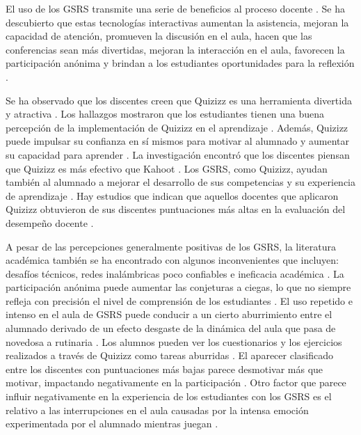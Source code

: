 \documentclass[spanish]{textolivre}
\begin{document}
El uso de los GSRS transmite una serie de beneficios al proceso docente \cite{wentao2017}. Se ha descubierto que estas tecnologías interactivas aumentan la asistencia, mejoran la capacidad de atención, promueven la discusión en el aula, hacen que las conferencias sean más divertidas, mejoran la interacción en el aula, favorecen la participación anónima y brindan a los estudiantes oportunidades para la reflexión \cite{goksun2019, wang2015}.

Se ha observado que los discentes creen que Quizizz es una herramienta divertida y atractiva \cite{zuhriyah2020}. Los hallazgos mostraron que los estudiantes tienen una buena percepción de la implementación de Quizizz en el aprendizaje \cite{dewi2021}. Además, Quizizz puede impulsar su confianza en sí mismos para motivar al alumnado y aumentar su capacidad para aprender \cite{irwansyah2021, zuhriyah2020}. La investigación encontró que los discentes piensan que Quizizz es más efectivo que Kahoot \cite{goksun2019}. Los GSRS, como Quizizz, ayudan también al alumnado a mejorar el desarrollo de sus competencias \cite{sahak2021, wolff2016} y su experiencia de aprendizaje \cite{chaiyo2017}. Hay estudios que indican que aquellos docentes que aplicaron Quizizz obtuvieron de sus discentes puntuaciones más altas en la evaluación del desempeño docente \cite{zhao2019}.

A pesar de las percepciones generalmente positivas de los GSRS, la literatura académica también se ha encontrado con algunos inconvenientes que incluyen: desafíos técnicos, redes inalámbricas poco confiables e ineficacia académica \cite{aljaloud2015}. La participación anónima puede aumentar las conjeturas a ciegas, lo que no siempre refleja con precisión el nivel de comprensión de los estudiantes \cite{nielsen2013}. El uso repetido e intenso en el aula de GSRS puede conducir a un cierto aburrimiento entre el alumnado derivado de un efecto desgaste de la dinámica del aula que pasa de novedosa a rutinaria \cite{wang2015}. Los alumnos pueden ver los cuestionarios y los ejercicios realizados a través de Quizizz como tareas aburridas \cite{mohamad2020}. El aparecer clasificado entre los discentes con puntuaciones más bajas parece desmotivar más que motivar, impactando negativamente en la participación \cite{bottentuit2020}. Otro factor que parece influir negativamente en la experiencia de los estudiantes con los GSRS es el relativo a las interrupciones en el aula causadas por la intensa emoción experimentada por el alumnado mientras juegan \cite{mason2021}.
\end{document}

